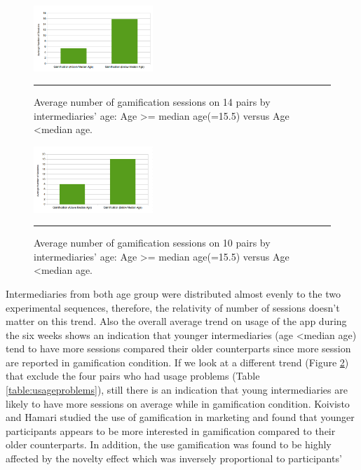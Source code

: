 \documentclass{sig-alternate}
\begin{document}
\begin{figure}[htbp]
  \centering
    \includegraphics[width=0.4\textwidth]{gambyage.png}
    \rule{26em}{0.5pt}
  \caption{Average number of gamification sessions on  14 pairs by intermediaries' age: Age \textgreater= median age(=15.5) versus Age \textless median age.}
  \label{figure:gambyage}
\end{figure}\newline
\begin{figure}[htbp]      
  \centering
    \includegraphics[width=0.4\textwidth]{gambyage_mod.png}
    \rule{26em}{0.5pt}
  \caption{Average number of gamification sessions on  10 pairs by intermediaries' age: Age \textgreater= median age(=15.5) versus Age \textless median age.}
  \label{figure:gambyage_mod}
\end{figure}\newline
Intermediaries from both age group were distributed almost evenly to the two experimental sequences, therefore, the relativity of number of sessions doesn't matter on this trend. Also the overall average trend on usage of the app during the six weeks shows an indication that younger intermediaries (age \textless median age) tend to have more sessions compared their older counterparts since more session are reported in gamification condition.\newline 
If we look at a different trend (Figure \ref{figure:gambyage_mod}) that exclude the four pairs who had usage problems (Table \ref{table:usageproblems}), still there is an indication that young intermediaries are likely to have more sessions on average while in gamification condition. Koivisto and Hamari \cite{koivisto2014demographic} studied the use of gamification in marketing and found that younger participants appears to be more interested in gamification compared to their older counterparts. In addition, the use gamification was found to be highly affected by the novelty effect which was inversely proportional to participants' 
\end{document}
